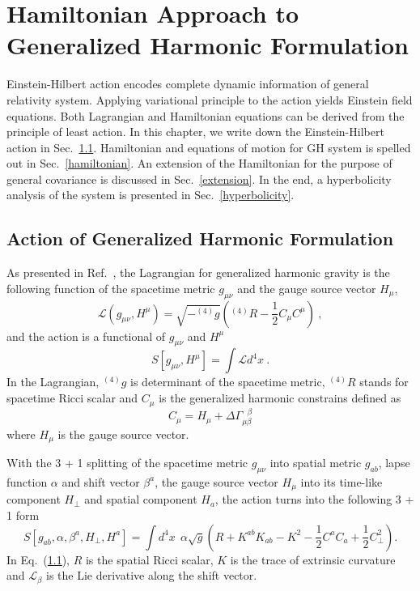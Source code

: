 \chapter{Hamiltonian Approach to Generalized Harmonic Formulation}
Einstein-Hilbert action encodes complete dynamic information of general relativity system. Applying variational principle to the action yields Einstein field equations. Both Lagrangian and Hamiltonian equations can be derived from the principle of least action. In this chapter, we write down the Einstein-Hilbert action in Sec.~\ref{action}. Hamiltonian and equations of motion for GH system is spelled out in Sec.~\ref{hamiltonian}. An extension of the Hamiltonian for the purpose of general covariance is discussed in Sec.~\ref{extension}. In the end, a hyperbolicity analysis of the system is presented in Sec.~\ref{hyperbolicity}. 
\section{Action of Generalized Harmonic Formulation}\label{action}
As presented in Ref.~\cite{Brown:2010rya}, the Lagrangian for generalized harmonic gravity is the following function of the spacetime metric $g_{\mu\nu}$ and the gauge source vector $H_{\mu}$, 
\begin{equation}
\mathscr{L}\left(g_{\mu\nu}, H^{\mu}\right) = \sqrt{-^{(4)}g} \left(^{(4)}R - \frac{1}{2}C_{\mu}C^{\mu}\right) \ , 
\end{equation}
and the action is a functional of $g_{\mu\nu}$ and $H^{\mu}$
\begin{equation}\label{action}
S\left[g_{\mu\nu}, H^{\mu}\right] = \int \mathscr{L} d^{4}x \ .
\end{equation}
In the Lagrangian, $^{(4)}g$ is determinant of the spacetime metric, $^{(4)}R$ stands for spacetime Ricci scalar and $C_{\mu}$ is the generalized harmonic constrains defined as
\begin{equation}
C_{\mu} = H_{\mu} + \Delta \Gamma^{~~~\beta}_{\mu\beta}
\end{equation}
where $H_{\mu}$ is the gauge source vector. 

With the 3 + 1 splitting of the spacetime metric $g_{\mu\nu}$ into spatial metric $g_{ab}$, lapse function $\alpha$ and shift vector $\beta^{a}$, the gauge source vector $H_{\mu}$ into its time-like component $H_{\perp}$ and spatial component $H_{a}$, the action turns into the following 3 + 1 form
\begin{equation}\label{3+1action}
S\left[g_{ab}, \alpha, \beta^{a}, H_{\perp}, H^{a}\right] = \int d^{4}x~~\alpha \sqrt{g} \left( R + K^{ab}K_{ab} - K^{2} - \frac{1}{2}C^{a}C_{a} + \frac{1}{2}C_{\perp}^{2}\right).
\end{equation}
In Eq.~(\ref{action}), $R$ is the spatial Ricci scalar, $K$ is the trace of extrinsic curvature and $\mathcal{L}_{\beta}$ is the Lie derivative along the shift vector. 

